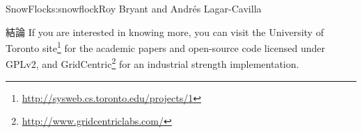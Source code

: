 \begin{aosachapter}{SnowFlock}{s:snowflock}{Roy Bryant and Andr\'e{s} Lagar-Cavilla}
\begin{aosasect1}{結論}
If you are interested in knowing more, you can visit the University of
Toronto site\footnote{\url{http://sysweb.cs.toronto.edu/projects/1}} for the
academic papers and open-source code licensed under GPLv2, and
GridCentric\footnote{\url{http://www.gridcentriclabs.com/}} for an industrial strength
implementation.

\end{aosasect1}

\end{aosachapter}

